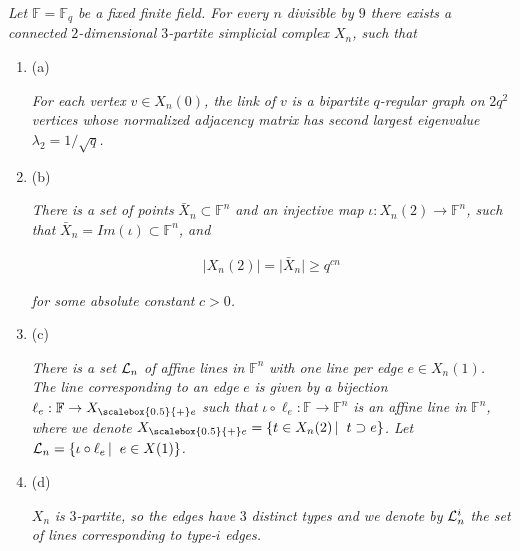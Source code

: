 \documentclass[10pt,a4paper]{article}
\begin{document}
\emph{Let $\mathbb{F}=\mathbb{F}_{q}$ be a fixed finite field. For every $n$ divisible by $9$ there exists a connected $2$-dimensional $3$-partite simplicial complex $X_{n}$, such that}\par


\begin{enumerate}


\item[] 
(a) 


\emph{For each vertex }$v\in X_{n}(0)$\emph{, the link of }$v$\emph{ is a bipartite }$q$\emph{-regular graph on }$2q^{2}$\emph{ vertices whose normalized adjacency matrix has second largest eigenvalue }$\lambda_{2}=1/\sqrt{q}$\emph{.}\par





\item[] 
(b) 


\emph{There is a set of points }$\bar{X}_{n}\subset\mathbb{F}^{n}$\emph{ and an injective map }$\iota:X_{n}(2)\to\mathbb{F}^{n}$\emph{, such that }$\bar{X}_{n}=Im(\iota)\subset\mathbb{F}^{n}$\emph{, and}\par


\[\begin{gathered}
\lvert X_{n}(2)\rvert=\lvert\bar{X}_{n}\rvert\geq q^{cn}
\end{gathered}\]


\emph{for some absolute constant }$c>0$\emph{.}\par





\item[] 
(c) 


\emph{There is a set }${\cal L}_{n}$\emph{ of affine lines in }$\mathbb{F}^{n}$\emph{ with one line per edge }$e\in X_{n}(1)$\emph{. The line corresponding to an edge }$e$\emph{ is given by a bijection }$\ell_{e}:\mathbb{F}\to{X}_{\scalebox{0.5}{+}e}$\emph{ such that }$\iota\circ\ell_{e}:\mathbb{F}\to\mathbb{F}^{n}$\emph{ is an affine line in }$\mathbb{F}^{n}$\emph{, where we denote }${X}_{\scalebox{0.5}{+}e}=\left\{t\in X_{n}(2)\left|\;\vphantom{t\in X_{n}(2)t\supset e}\right.t\supset e\right\}$\emph{. Let }${\cal L}_{n}=\left\{\iota\circ\ell_{e}\left|\;\vphantom{\iota\circ\ell_{e}e\in
X(1)}\right.e\in X(1)\right\}$\emph{.}\par





\item[] 
(d) 


$X_{n}$\emph{ is }$3$\emph{-partite, so the edges have }$3$\emph{ distinct types and we denote by }${\cal L}^{i}_{n}$\emph{ the set of lines corresponding to type-}$i$\emph{ edges.}\par





\end{enumerate}
\end{document}
